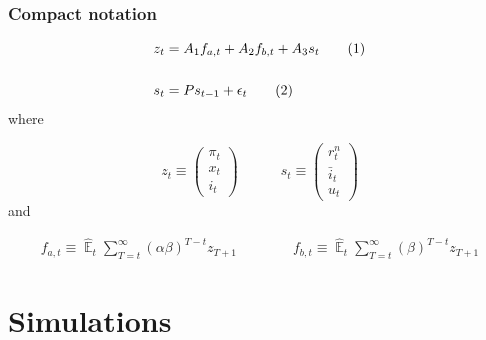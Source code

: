 \documentclass{beamer}
\DeclareMathOperator{\E}{\mathbb{E}}
\newcommand\numberthis{\addtocounter{equation}{1}\tag{\theequation}} %
\begin{document}
\begin{frame}
	\frametitle{Compact notation}

 \begin{align*}
z_t & = A_1 f_{a,t} + A_2 f_{b,t} + A_3 s_t \label{LOM_LR} \numberthis \\
\\
s_t & = P s_{t-1} + \epsilon_t \label{exog} \numberthis
\end{align*}
where

\begin{equation}
 z_t \equiv \begin{pmatrix} \pi_t \\ x_t \\ i_t
 \end{pmatrix} 
 \quad \quad \quad 
  s_t  \equiv \begin{pmatrix} r_t^n \\ \bar{i}_t \\ u_t 
 \end{pmatrix} 
\end{equation}
and

  \begin{align}
f_{a,t}  \equiv  \hat{\E}_t\sum_{T=t}^{\infty} (\alpha\beta)^{T-t } z_{T+1} \quad \quad \quad \quad f_{b,t}  \equiv \hat{\E}_t\sum_{T=t}^{\infty} (\beta)^{T-t } z_{T+1} \label{fafb}
\end{align}




\end{frame}

\section{Simulations}
\end{document}
